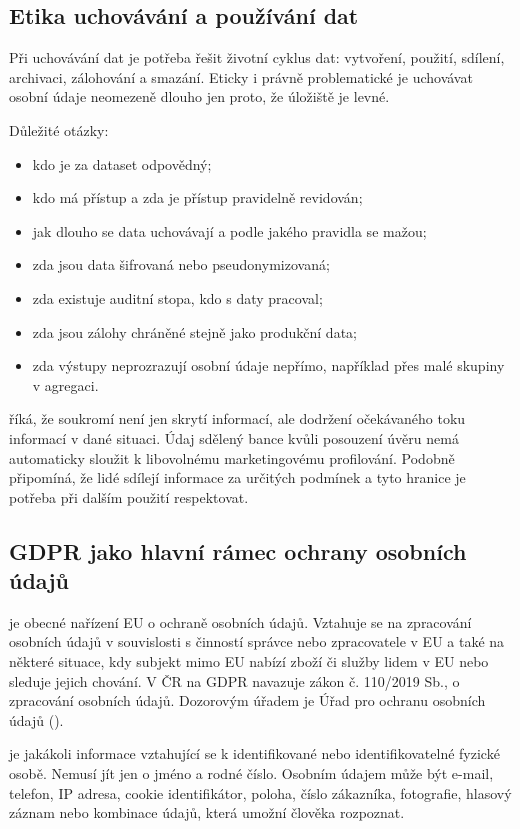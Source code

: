 \subsection{Etika uchovávání a používání dat}
Při uchovávání dat je potřeba řešit životní cyklus dat: vytvoření, použití, sdílení, archivaci,
zálohování a smazání. Eticky i právně problematické je uchovávat osobní údaje neomezeně dlouho jen
proto, že úložiště je levné.

Důležité otázky:
\begin{itemize}
  \item kdo je za dataset odpovědný;
  \item kdo má přístup a zda je přístup pravidelně revidován;
  \item jak dlouho se data uchovávají a podle jakého pravidla se mažou;
  \item zda jsou data šifrovaná nebo pseudonymizovaná;
  \item zda existuje auditní stopa, kdo s daty pracoval;
  \item zda jsou zálohy chráněné stejně jako produkční data;
  \item zda výstupy neprozrazují osobní údaje nepřímo, například přes malé skupiny v agregaci.
\end{itemize}

 říká, že soukromí není jen skrytí informací, ale dodržení očekávaného
toku informací v dané situaci. Údaj sdělený bance kvůli posouzení úvěru nemá automaticky sloužit k
libovolnému marketingovému profilování. Podobně  připomíná, že lidé
sdílejí informace za určitých podmínek a tyto hranice je potřeba při dalším použití respektovat.

\subsection{GDPR jako hlavní rámec ochrany osobních údajů}
 je obecné nařízení EU o ochraně osobních údajů. Vztahuje se na zpracování osobních údajů
v souvislosti s činností správce nebo zpracovatele v EU a také na některé situace, kdy subjekt mimo
EU nabízí zboží či služby lidem v EU nebo sleduje jejich chování. V ČR na GDPR navazuje zákon
č. 110/2019 Sb., o zpracování osobních údajů. Dozorovým úřadem je Úřad pro ochranu osobních údajů
().

 je jakákoli informace vztahující se k identifikované nebo identifikovatelné fyzické
osobě. Nemusí jít jen o jméno a rodné číslo. Osobním údajem může být e-mail, telefon, IP adresa,
cookie identifikátor, poloha, číslo zákazníka, fotografie, hlasový záznam nebo kombinace údajů, která
umožní člověka rozpoznat.

